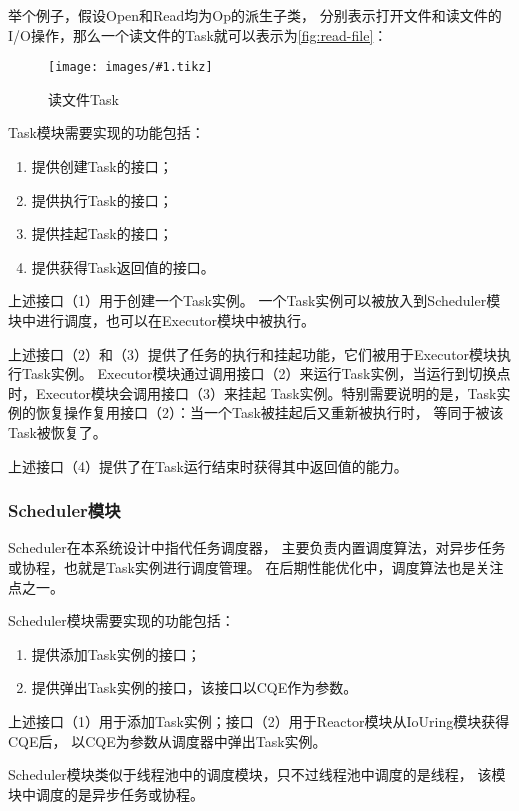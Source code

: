 \documentclass[supercite]{HustGraduPaper}
\newcommand{\cfig}[3]{
  \begin{figure}[htb]
    \centering
    \texttt{[image: images/\#1.tikz]}
    \caption{#3}
    \label{fig:#1}
  \end{figure}
}
\newcommand{\rfig}[1]{\autoref{fig:#1}}
\theoremstyle{definition}
\begin{document}
举个例子，假设Open和Read均为Op的派生子类，
分别表示打开文件和读文件的I/O操作，那么一个读文件的Task就可以表示为\rfig{read-file}：

\cfig{read-file}{0.4}{读文件Task}

Task模块需要实现的功能包括：

\begin{enumerate}[label={(\arabic*)}]
  \item 提供创建Task的接口；
  \item 提供执行Task的接口；
  \item 提供挂起Task的接口；
  \item 提供获得Task返回值的接口。
\end{enumerate}

上述接口（1）用于创建一个Task实例。
一个Task实例可以被放入到Scheduler模块中进行调度，也可以在Executor模块中被执行。\par

上述接口（2）和（3）提供了任务的执行和挂起功能，它们被用于Executor模块执行Task实例。
Executor模块通过调用接口（2）来运行Task实例，当运行到切换点时，Executor模块会调用接口（3）来挂起
Task实例。特别需要说明的是，Task实例的恢复操作复用接口（2）：当一个Task被挂起后又重新被执行时，
等同于被该Task被恢复了。\par

上述接口（4）提供了在Task运行结束时获得其中返回值的能力。\par

\subsubsection{Scheduler模块}

Scheduler在本系统设计中指代任务调度器，
主要负责内置调度算法，对异步任务或协程，也就是Task实例进行调度管理。
在后期性能优化中，调度算法也是关注点之一。\par

Scheduler模块需要实现的功能包括：

\begin{enumerate}[label={(\arabic*)}]
  \item 提供添加Task实例的接口；
  \item 提供弹出Task实例的接口，该接口以CQE作为参数。
\end{enumerate}

上述接口（1）用于添加Task实例；接口（2）用于Reactor模块从IoUring模块获得CQE后，
以CQE为参数从调度器中弹出Task实例。\par

Scheduler模块类似于线程池中的调度模块，只不过线程池中调度的是线程，
该模块中调度的是异步任务或协程。\par
\end{document}
